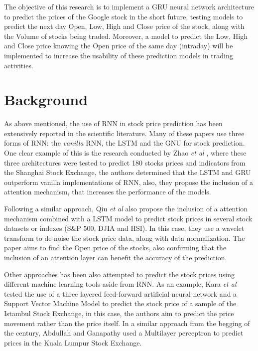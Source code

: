 \documentclass[10pt,twocolumn,letterpaper]{article}
\begin{document}
The objective of this research is to implement a GRU neural network architecture to predict the prices of the Google stock in the short future, testing models to predict the next day Open, Low, High and Close price of the stock, along with the Volume of stocks being traded. Moreover, a model to predict the Low, High and Close price knowing the Open price of the same day (intraday) will be implemented to increase the usability of these prediction models in trading activities.



\section{Background}

As above mentioned, the use of RNN in stock price prediction has been extensively reported in the scientific literature. Many of these papers use three forms of RNN: the \textit{vanilla} RNN, the LSTM and the GNU for stock prediction. One clear example of this is the research conducted by Zhao \textit{et al} \cite{Zhao2020}, where these three architectures were tested to predict 180 stocks prices and indicators from the Shanghai Stock Exchange, the authors determined that the LSTM and GRU outperform vanilla implementations of RNN, also, they propose the inclusion of a attention mechanism, that increases the performance of the models.

Following a similar approach, Qiu \textit{et al} \cite{Qiu2020} also propose the inclusion of a attention mechanism combined with a LSTM model to predict stock prices in several stock datasets or indexes (S\&P 500, DJIA and HSI). In this case, they use a wavelet transform to de-noise the stock price data, along with data normalization. The paper aims to find the Open price of the stocks, also confirming that the inclusion of an attention layer can benefit the accuracy of the prediction.

Other approaches has been also attempted to predict the stock prices using different machine learning tools aside from RNN. As an example, Kara \textit{et al} \cite{Kara2011} tested the use of a three layered feed-forward artificial neural network and a Support Vector Machine Model to predict the stock price of a sample of the Istambul Stock Exchange, in this case, the authors aim to predict the price movement rather than the price itself. In a similar approach from the begging of the century, Abdullah and Ganapathy \cite{Abdullah2000} used a Multilayer perceptron to predict prices in the Kuala Lumpur Stock Exchange.
\end{document}
